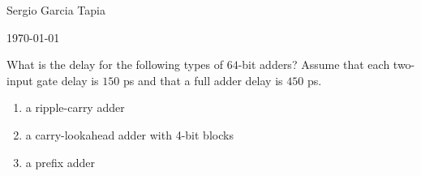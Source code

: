 \documentclass[12pt]{article}
\newenvironment{ex}[2][Exercise]{\begin{trivlist}
		\item[\hskip \labelsep {\bfseries #1}\hskip \labelsep {\bfseries #2.}]}{\end{trivlist}}
\begin{document}

\noindent Sergio Garcia Tapia \hfill

 \hfill

 \hfill 

\noindent\today

\begin{ex}{5.1}
	What is the delay for the following types of $64$-bit adders? Assume
	that each two-input gate delay is $150$ ps and that a full adder delay
	is $450$ ps.
	\begin{enumerate}[label=(\alph*)]
		\item a ripple-carry adder
		\item a carry-lookahead adder with 4-bit blocks
		\item a prefix adder
	\end{enumerate}
\end{ex}
\end{document}
